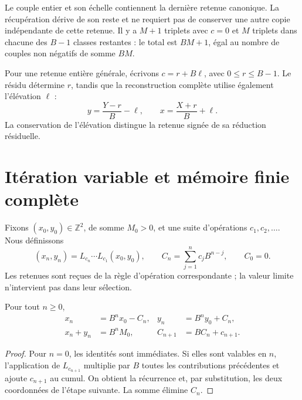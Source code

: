 Le couple entier et son échelle contiennent la dernière retenue canonique. La
récupération dérive de son reste et ne requiert pas de conserver une autre copie
indépendante de cette retenue. Il y a \(M+1\) triplets avec \(c=0\) et
\(M\) triplets dans chacune des \(B-1\) classes restantes : le total
est \(BM+1\), égal au nombre de couples non négatifs de somme \(BM\).

Pour une retenue entière générale, écrivons \(c=r+B\ell\), avec \(0\leq r\leq B-1\). Le résidu détermine \(r\), tandis que la reconstruction complète utilise également l'élévation \(\ell\) :
\begin{equation}
 y=\frac{Y-r}{B}-\ell,\qquad
 x=\frac{X+r}{B}+\ell.
 \label{x_reciprocidad:lib03:elevacion}
\end{equation}
La conservation de l'élévation distingue la retenue signée de sa réduction résiduelle.

\section{Itération variable et mémoire finie complète}
\label{x_reciprocidad:lib03:memoria}

Fixons \((x_0,y_0)\in\mathbb Z^2\), de somme \(M_0>0\), et une suite d'opérations \(c_1,c_2,\ldots\). Nous définissons
\begin{equation}
 (x_n,y_n)=L_{c_n}\cdots L_{c_1}(x_0,y_0),\qquad
 C_n=\sum_{j=1}^n c_jB^{n-j},\qquad C_0=0.
 \label{x_reciprocidad:lib03:registro-acumulado}
\end{equation}
Les retenues sont reçues de la règle d'opération correspondante ; la valeur limite n'intervient pas dans leur sélection.

\begin{theorem}
\label{x_reciprocidad:lib03:teo-acumulacion}
Pour tout \(n\geq0\),
\begin{equation}
 \begin{aligned}
 x_n&=B^nx_0-C_n,& y_n&=B^ny_0+C_n,\\
 x_n+y_n&=B^nM_0,& C_{n+1}&=BC_n+c_{n+1}.
 \end{aligned}
 \label{x_reciprocidad:lib03:iteracion-exacta}
\end{equation}
\end{theorem}

\begin{proof}
Pour \(n=0\), les identités sont immédiates. Si elles sont valables en
\(n\), l’application de \(L_{c_{n+1}}\) multiplie par \(B\) toutes
les contributions précédentes et ajoute \(c_{n+1}\) au cumul.
On obtient la récurrence et, par substitution, les deux coordonnées de
l’étape suivante. La somme élimine \(C_n\).
\end{proof}

